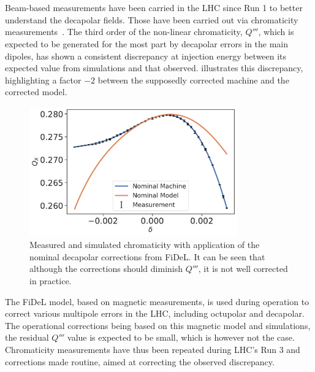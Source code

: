 \section{}



Beam-based measurements have been carried in the LHC since Run 1 to better understand the decapolar
fields. Those have been carried out via chromaticity
measurements~\cite{maclean_non-linear_2011,maclean_commissioning_2016,maclean_measurement_2014}. 
The third order of the non-linear chromaticity, $Q'''$, which is expected to be generated for the
most part by decapolar errors in the main dipoles, has shown a consistent discrepancy at injection
energy between its expected value from simulations and that observed.
 illustrates this discrepancy, highlighting a factor
$-2$ between the supposedly corrected machine and the corrected model.

\begin{figure}[!htb]
    \centering
    \includegraphics[width=0.8\textwidth]{images/dq3_corrected_simulation_fidel.pdf}
    \caption{Measured and simulated chromaticity with application of the nominal decapolar
    corrections from FiDeL. It can be seen that although the corrections should diminish $Q'''$, it
    is not well corrected in practice.}
    \label{fig:decapoles:bare_chroma_vs_simulations}
\end{figure}

The FiDeL model, based on magnetic measurements, is used during operation to correct various
multipole errors in the LHC, including octupolar and decapolar. The operational corrections being
based on this magnetic model and simulations, the residual $Q'''$ value is expected to be small,
which is however not the case.  Chromaticity measurements have thus been repeated during LHC's Run 3
and corrections made routine, aimed at correcting the observed discrepancy.

